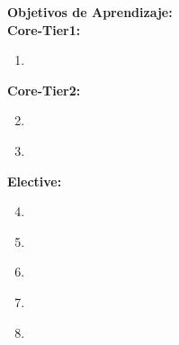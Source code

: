 \noindent \textbf{Objetivos de Aprendizaje:}\\
\noindent \textbf{Core-Tier1:}
\begin{enumerate}
	\setcounter{enumi}{0}
	\item \PDParallelArchitectureLOExplainTheShared\xspace[\PDParallelArchitectureLOExplainTheSharedLevel]\label{sec:BOK:PDParallelArchitectureLOExplainTheShared}
\end{enumerate}
\noindent \textbf{Core-Tier2:}
\begin{enumerate}
	\setcounter{enumi}{1}
	\item \PDParallelArchitectureLODescribeTheAndKey\xspace[\PDParallelArchitectureLODescribeTheAndKeyLevel]\label{sec:BOK:PDParallelArchitectureLODescribeTheAndKey}
	\item \PDParallelArchitectureLOCharacterizeTheTasks\xspace[\PDParallelArchitectureLOCharacterizeTheTasksLevel]\label{sec:BOK:PDParallelArchitectureLOCharacterizeTheTasks}
\end{enumerate}
\noindent \textbf{Elective:}
\begin{enumerate}
	\setcounter{enumi}{3}
	\item \PDParallelArchitectureLODescribeTheLimitationsVs\xspace[\PDParallelArchitectureLODescribeTheLimitationsVsLevel]\label{sec:BOK:PDParallelArchitectureLODescribeTheLimitationsVs}
	\item \PDParallelArchitectureLOExplainTheEach\xspace[\PDParallelArchitectureLOExplainTheEachLevel]\label{sec:BOK:PDParallelArchitectureLOExplainTheEach}
	\item \PDParallelArchitectureLODescribeAssembly\xspace[\PDParallelArchitectureLODescribeAssemblyLevel]\label{sec:BOK:PDParallelArchitectureLODescribeAssembly}
	\item \PDParallelArchitectureLODescribeTheMaintaining\xspace[\PDParallelArchitectureLODescribeTheMaintainingLevel]\label{sec:BOK:PDParallelArchitectureLODescribeTheMaintaining}
	\item \PDParallelArchitectureLODescribeTheChallenges\xspace[\PDParallelArchitectureLODescribeTheChallengesLevel]\label{sec:BOK:PDParallelArchitectureLODescribeTheChallenges}
\end{enumerate}


